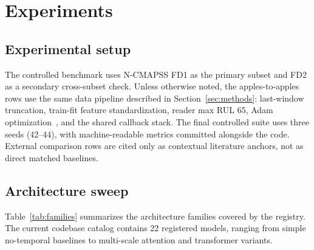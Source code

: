 \section{Experiments}
\label{sec:experiments}

\subsection{Experimental setup}

The controlled benchmark uses N-CMAPSS FD1 as the primary subset and FD2 as a secondary cross-subset check. Unless otherwise noted, the apples-to-apples rows use the same data pipeline described in Section~\ref{sec:methods}: last-window truncation, train-fit feature standardization, reader max RUL 65, Adam optimization~\cite{kingma2015adam}, and the shared callback stack. The final controlled suite uses three seeds (42--44), with machine-readable metrics committed alongside the code. External comparison rows are cited only as contextual literature anchors, not as direct matched baselines.

\subsection{Architecture sweep}

Table~\ref{tab:families} summarizes the architecture families covered by the registry. The current codebase catalog contains 22 registered models, ranging from simple no-temporal baselines to multi-scale attention and transformer variants.

\begin{table}[t]
\centering
\caption{Architecture families in the benchmark harness.}
\label{tab:families}
\small
{}
\end{table}


